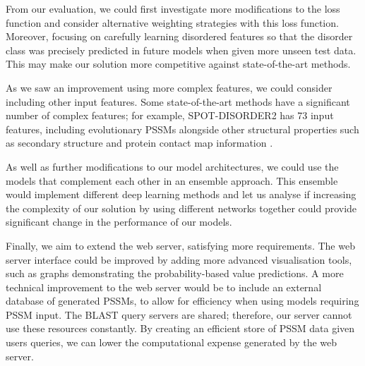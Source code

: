 \documentclass{l4proj}
\begin{document}
From our evaluation, we could first investigate more modifications to the loss function and consider alternative weighting strategies with this loss function. Moreover, focusing on carefully learning disordered features so that the disorder class was precisely predicted in future models when given more unseen test data. This may make our solution more competitive against state-of-the-art methods.

As we saw an improvement using more complex features, we could consider including other input features. Some state-of-the-art methods have a significant number of complex features; for example, SPOT-DISORDER2 has 73 input features, including evolutionary PSSMs alongside other structural properties such as secondary structure and protein contact map information \cite{Hanson:19}.

As well as further modifications to our model architectures, we could use the models that complement each other in an ensemble approach. This ensemble would implement different deep learning methods and let us analyse if increasing the complexity of our solution by using different networks together could provide significant change in the performance of our models.

Finally, we aim to extend the web server, satisfying more requirements. The web server interface could be improved by adding more advanced visualisation tools, such as graphs demonstrating the probability-based value predictions. A more technical improvement to the web server would be to include an external database of generated PSSMs, to allow for efficiency when using models requiring PSSM input. The BLAST query servers are shared; therefore, our server cannot use these resources constantly. By creating an efficient store of PSSM data given users queries, we can lower the computational expense generated by the web server.


%
% 
\end{document}
